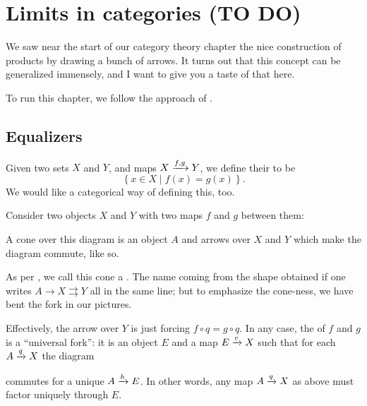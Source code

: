 \chapter{Limits in categories (TO DO)}
\label{ch:category_limits}
We saw near the start of our category theory chapter
the nice construction of products by drawing
a bunch of arrows.
It turns out that this concept can be generalized immensely,
and I want to give you a taste of that here.

To run this chapter, we follow the approach of \cite{ref:msci}.

\section{Equalizers}
Given two sets $X$ and $Y$, and maps $X \xrightarrow{f,g} Y$, we define their  to be
\[ \left\{ x \in X \mid f(x) = g(x) \right\}. \]
We would like a categorical way of defining this, too.

Consider two objects $X$ and $Y$ with two maps $f$ and $g$ between them:
\begin{center}
\end{center}
A cone over this diagram is an object $A$ and arrows over $X$ and $Y$
which make the diagram commute, like so.
\begin{center}
\end{center}
As per \cite{ref:msci}, we call this cone a .
The name coming from the shape obtained if one writes $A \to X \rightrightarrows Y$
all in the same line; but to emphasize the cone-ness, we have bent the fork in our pictures.

Effectively, the arrow over $Y$ is just forcing $f \circ q = g \circ q$.
In any case, the  of $f$ and $g$ is a ``universal fork'':
it is an object $E$ and a map $E \xrightarrow{e} X$ such that
for each $A \xrightarrow{q} X$ the diagram
\begin{center}
\end{center}
commutes for a unique $A \xrightarrow{h} E$.
In other words, any map $A \xrightarrow{q} X$ as above
must factor uniquely through $E$.

